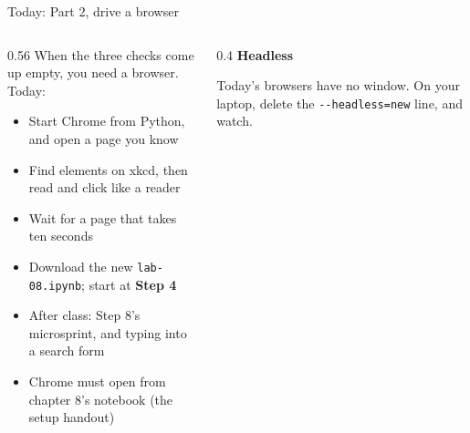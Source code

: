 \documentclass[9pt,aspectratio=169]{beamer}
\begin{document}
\begin{frame}{Today: Part 2, drive a browser}
    \begin{columns}[T]
        \begin{column}{0.56\textwidth}
            When the three checks come up empty, you need a browser. Today:
            \begin{itemize}\small
                \item Start Chrome from Python, and open a page you know
                \item Find elements on xkcd, then read and click like a reader
                \item Wait for a page that takes ten seconds
            \end{itemize}

            \medskip
            \begin{itemize}\small
                \item Download the new \texttt{lab-08.ipynb}; start at \textbf{Step 4}
                \item After class: Step 8's microsprint, and typing into a search form
                \item Chrome must open from chapter 8's notebook (the setup handout)
            \end{itemize}
        \end{column}
        \begin{column}{0.4\textwidth}
            \textbf{Headless}\\[2pt]
            {\footnotesize Today's browsers have no window. On your laptop, delete the \texttt{-{}-headless=new} line, and watch.\par}
        \end{column}
    \end{columns}
\end{frame}
\end{document}
